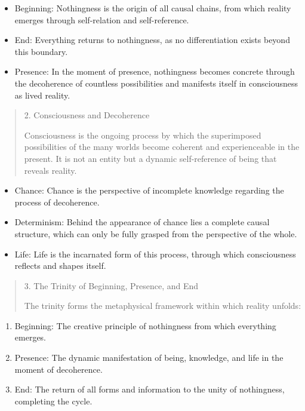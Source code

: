 \documentclass[
  ngerman,
]{article}
\begin{document}
\begin{itemize}
\item
  Beginning: Nothingness is the origin of all causal chains, from which
  reality emerges through self-relation and self-reference.
\item
  End: Everything returns to nothingness, as no differentiation exists
  beyond this boundary.
\item
  Presence: In the moment of presence, nothingness becomes concrete
  through the decoherence of countless possibilities and manifests
  itself in consciousness as lived reality.
\end{itemize}

\begin{quote}
2. Consciousness and Decoherence

Consciousness is the ongoing process by which the superimposed
possibilities of the many worlds become coherent and experienceable in
the present. It is not an entity but a dynamic self-reference of being
that reveals reality.
\end{quote}

\begin{itemize}
\item
  Chance: Chance is the perspective of incomplete knowledge regarding
  the process of decoherence.
\item
  Determinism: Behind the appearance of chance lies a complete causal
  structure, which can only be fully grasped from the perspective of the
  whole.
\item
  Life: Life is the incarnated form of this process, through which
  consciousness reflects and shapes itself.
\end{itemize}

\begin{quote}
3. The Trinity of Beginning, Presence, and End

The trinity forms the metaphysical framework within which reality
unfolds:
\end{quote}

\begin{enumerate}
\def\labelenumi{\arabic{enumi}.}
\item
  Beginning: The creative principle of nothingness from which everything
  emerges.
\item
  Presence: The dynamic manifestation of being, knowledge, and life in
  the moment of decoherence.
\item
  End: The return of all forms and information to the unity of
  nothingness, completing the cycle.
\end{enumerate}
\end{document}
